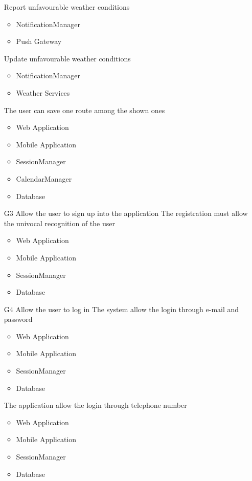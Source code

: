 \begin{itemize}
 	\subitem[G2.7] Report unfavourable weather conditions
 	\begin{itemize}[leftmargin=1in]
 		\item NotificationManager
 		\item Push Gateway
 	\end{itemize}
 	\subitem[G2.8] Update unfavourable weather conditions
 	\begin{itemize}[leftmargin=1in]
 		\item NotificationManager
 		\item Weather Services
 	\end{itemize}
 	\subitem[G2.9] The user can save one route among the shown ones
 	\begin{itemize}[leftmargin=1in]
 		\item Web Application
 		\item Mobile Application
 		\item SessionManager
 		\item CalendarManager
 		\item Database
 	\end{itemize}
 \vspace{0.5cm}
 
 	\item[G3] Allow the user to sign up into the application
 	\subitem[G3.1] The registration must allow the univocal recognition of the user
 	\begin{itemize}[leftmargin=1in]
 		\item Web Application
 		\item Mobile Application
 		\item SessionManager
 		\item Database
 	\end{itemize}
 \vspace{0.5cm}
 
 	\item[G4] Allow the user to log in
 	\subitem[G4.1] The system allow the login through e-mail and password
 	\begin{itemize}[leftmargin=1in]
 		\item Web Application
 		\item Mobile Application
 		\item SessionManager
 		\item Database
 	\end{itemize}
 	\subitem[G4.2] The application allow the login through telephone number
 	\begin{itemize}[leftmargin=1in]
 		\item Web Application
 		\item Mobile Application
 		\item SessionManager
 		\item Database
 	\end{itemize}
 \vspace{0.5cm}
 

\end{itemize}

